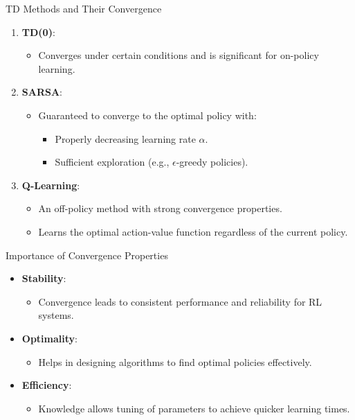 \documentclass[aspectratio=169]{beamer}
\begin{document}
\begin{frame}[fragile]{TD Methods and Their Convergence}
    \begin{enumerate}
        \item \textbf{TD(0)}:
            \begin{itemize}
                \item Converges under certain conditions and is significant for on-policy learning.
            \end{itemize}
        \item \textbf{SARSA}:
            \begin{itemize}
                \item Guaranteed to converge to the optimal policy with:
                \begin{itemize}
                    \item Properly decreasing learning rate \( \alpha \).
                    \item Sufficient exploration (e.g., $\epsilon$-greedy policies).
                \end{itemize}
            \end{itemize}
        \item \textbf{Q-Learning}:
            \begin{itemize}
                \item An off-policy method with strong convergence properties.
                \item Learns the optimal action-value function regardless of the current policy.
            \end{itemize}
    \end{enumerate}
\end{frame}

\begin{frame}[fragile]{Importance of Convergence Properties}
    \begin{itemize}
        \item \textbf{Stability}:
            \begin{itemize}
                \item Convergence leads to consistent performance and reliability for RL systems.
            \end{itemize}
        \item \textbf{Optimality}:
            \begin{itemize}
                \item Helps in designing algorithms to find optimal policies effectively.
            \end{itemize}
        \item \textbf{Efficiency}:
            \begin{itemize}
                \item Knowledge allows tuning of parameters to achieve quicker learning times.
            \end{itemize}
    \end{itemize}
\end{frame}
\end{document}
